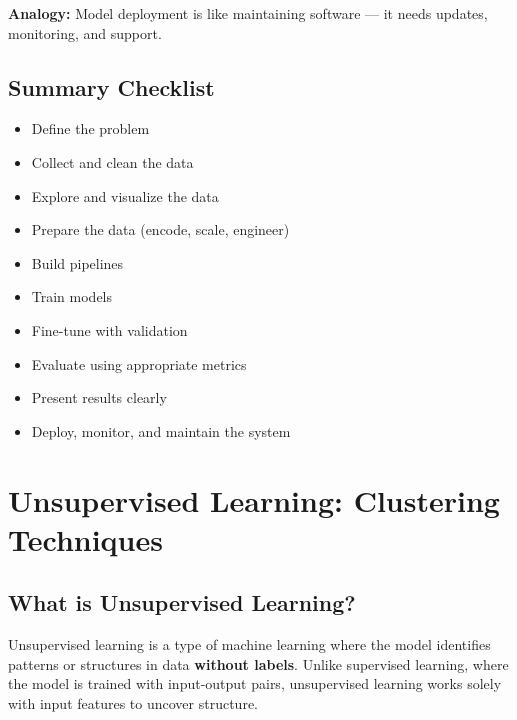 \documentclass[
  letterpaper,
  DIV=11,
  numbers=noendperiod]{scrreprt}
\providecommand{\tightlist}{%
  \setlength{\itemsep}{0pt}\setlength{\parskip}{0pt}}\usepackage{longtable,booktabs,array}
\begin{document}
\textbf{Analogy:} Model deployment is like maintaining software --- it
needs updates, monitoring, and support.

\section{Summary Checklist}\label{summary-checklist}

\begin{itemize}
\tightlist
\item
  Define the problem\\
\item
  Collect and clean the data\\
\item
  Explore and visualize the data\\
\item
  Prepare the data (encode, scale, engineer)\\
\item
  Build pipelines\\
\item
  Train models\\
\item
  Fine-tune with validation\\
\item
  Evaluate using appropriate metrics\\
\item
  Present results clearly\\
\item
  Deploy, monitor, and maintain the system
\end{itemize}


\chapter{Unsupervised Learning: Clustering
Techniques}\label{unsupervised-learning-clustering-techniques}

\section{What is Unsupervised
Learning?}\label{what-is-unsupervised-learning}

Unsupervised learning is a type of machine learning where the model
identifies patterns or structures in data \textbf{without labels}.
Unlike supervised learning, where the model is trained with input-output
pairs, unsupervised learning works solely with input features to uncover
structure.
\end{document}
